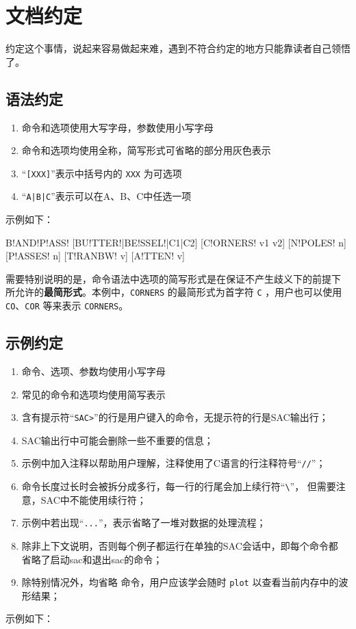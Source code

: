 \section{文档约定}
约定这个事情，说起来容易做起来难，遇到不符合约定的地方只能靠读者自己领悟了。

\subsection*{语法约定}
\begin{enumerate}
\item 命令和选项使用大写字母，参数使用小写字母
\item 命令和选项均使用全称，简写形式可省略的部分用灰色表示
\item ``\texttt{[XXX]}''表示中括号内的 \texttt{XXX} 为可选项
\item ``\texttt{A|B|C}''表示可以在A、B、C中任选一项
\end{enumerate}

示例如下：
\begin{SACSTX}
B!AND!P!ASS! [BU!TTER!|BE!SSEL!|C1|C2] [C!ORNERS! v1 v2] [N!POLES! n] [P!ASSES! n]
    [T!RANBW! v] [A!TTEN! v]
\end{SACSTX}

需要特别说明的是，命令语法中选项的简写形式是在保证不产生歧义下的前提下
所允许的\textbf{最简形式}。本例中，\texttt{CORNERS} 的最简形式为首字符
\texttt{C} ，用户也可以使用 \texttt{CO}、\texttt{COR} 等来表示 \texttt{CORNERS}。

\subsection*{示例约定}
\begin{enumerate}
\item 命令、选项、参数均使用小写字母
\item 常见的命令和选项均使用简写表示
\item 含有提示符``\texttt{SAC>}''的行是用户键入的命令，无提示符的行是SAC输出行；
\item SAC输出行中可能会删除一些不重要的信息；
\item 示例中加入注释以帮助用户理解，注释使用了C语言的行注释符号``\texttt{//}''；
\item 命令长度过长时会被拆分成多行，每一行的行尾会加上续行符``\verb|\|''，
    但需要注意，SAC中不能使用续行符；
\item 示例中若出现``\texttt{...}''，表示省略了一堆对数据的处理流程；
\item 除非上下文说明，否则每个例子都运行在单独的SAC会话中，即每个命令都
    省略了启动sac和退出sac的命令；
\item 除特别情况外，均省略  命令，用户应该学会随时
    \texttt{plot} 以查看当前内存中的波形结果；
\end{enumerate}

示例如下：
